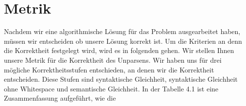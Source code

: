 \chapter{Metrik}




Nachdem wir eine algorithmische Lösung für das Problem ausgearbeitet haben, müssen wir entscheiden ob unsere Lösung korrekt ist. Um die Kriterien an denn die Korrektheit festgelegt wird, wird es in folgenden gehen. Wir stellen Ihnen unsere Metrik für die Korrektheit des Unparsens. Wir haben uns für drei mögliche Korrektheitsstufen entschieden, an denen wir die Korrektheit entscheiden. Diese Stufen sind syntaktische Gleichheit, syntaktische Gleichheit ohne Whitespace und semantische Gleichheit. In der Tabelle 4.1 ist eine Zusammenfassung aufgeführt, wie die 



